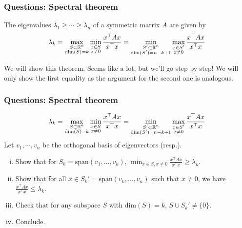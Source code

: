 \documentclass{beamer}
\begin{document}
\iffalse
\begin{frame}[t]
\frametitle{Questions: Spectral theorem}
\begin{theorem}
The eigenvalues $\lambda_1 \geq \cdots \geq \lambda_n$ of a symmetric matrix $A$ are given by
\begin{align*}
\lambda_k = \max_{\substack{S \subset \mathbb{R}^n \\ \text{dim}(S) = k}} \min_{\substack{x \in S \\ x \neq 0}} \frac{x^\top A x}{x^\top x} = \min_{\substack{S' \subset \mathbb{R}^n \\ \text{dim}(S') = n-k+1}} \max_{\substack{x \in S' \\ x \neq 0}} \frac{x^\top A x}{x^\top x}
\end{align*}
\end{theorem}
We will show this theorem. Seems like a lot, but we'll go step by step! We will only show the first equality as the argument for the second one is analogous.
\end{frame}

\begin{frame}[t]
\frametitle{Questions: Spectral theorem}
\vspace{-10pt}
\begin{align*}
\lambda_k = \max_{\substack{S \subset \mathbb{R}^n \\ \text{dim}(S) = k}} \min_{\substack{x \in S \\ x \neq 0}} \frac{x^\top A x}{x^\top x} = \min_{\substack{S' \subset \mathbb{R}^n \\ \text{dim}(S') = n-k+1}} \max_{\substack{x \in S' \\ x \neq 0}} \frac{x^\top A x}{x^\top x}
\end{align*}
Let $v_1, \cdots, v_n$ be the orthogonal basis of eigenvectors (resp.).
\begin{enumerate}[(i)]
\item Show that for $S_k = \text{span}(v_1, \dots, v_k)$, $\min_{x \in S, x \neq 0} \frac{x^\top A x}{x^\top x} \geq \lambda_k$.
\item Show that for all $x \in S_k' = \text{span}(v_k, \dots, v_n)$ such that $x \neq 0$, we have  $\frac{x^\top A x}{x^\top x} \leq \lambda_k$.
\item Check that for any subspace $S$ with $\text{dim}(S) = k$, $S \cup S_k' \neq \{0\}$.
\item Conclude.
\end{enumerate}
\end{frame}
\end{document}
